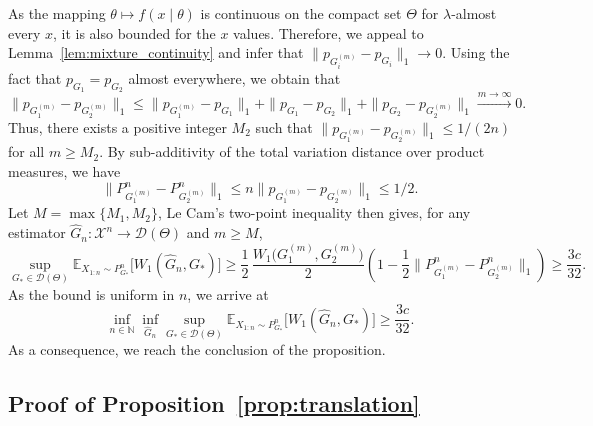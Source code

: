 \documentclass[11pt,twoside]{article} %
\begin{document}
As the mapping $\theta\mapsto f(x\mid \theta)$ is continuous on the compact set $\Theta$ for $\lambda$-almost every $x$, it is also bounded for the $x$ values. Therefore, we appeal to Lemma~\ref{lem:mixture_continuity} and infer that $\|p_{G_i^{(m)}}-p_{G_i}\|_1\to0$. Using the fact that $p_{G_1}=p_{G_2}$ almost everywhere, we obtain that
\begin{equation*}
    \|p_{G_1^{(m)}}-p_{G_2^{(m)}}\|_1
    \le\|p_{G_1^{(m)}}-p_{G_1}\|_1+ \|p_{G_1} - p_{G_2}\|_1 + \|p_{G_2}-p_{G_2^{(m)}}\|_1\xrightarrow{m\to\infty}0 .
\end{equation*}
Thus, there exists a positive integer $M_2$ such that $\|p_{G_1^{(m)}}-p_{G_2^{(m)}}\|_1\le 1/(2n)$ for all $m \geq M_2$. By sub-additivity of the total variation distance over product
measures, we have
$$\|P^n_{G_1^{(m)}}-P^n_{G_2^{(m)}}\|_1\le n\|p_{G_1^{(m)}}-p_{G_2^{(m)}}\|_1\le 1/2.$$
Let $M = \max\{M_1,M_2\}$, Le Cam's
two-point inequality \citep[e.g.,][Lemma 15.9]{wainwright2019high} then gives, for any estimator $\hat G_n:\mathcal X^n\to\mathcal D(\Theta)$ and $m \geq M$, 
\begin{equation*}
    \sup_{G_*\in\mathcal D(\Theta)}\mathbb E_{X_{1:n}\sim P_{G_*}^n}\big[W_1(\widehat G_n,G_*)\big]
    \geq    \frac{1}{2}\,\frac{W_1\big(G_1^{(m)},G_2^{(m)}\big)}{2}\left(1-\frac12\|P^n_{G_1^{(m)}}-P^n_{G_2^{(m)}}\|_1\right)
    \geq \frac{3c}{32}.
\end{equation*}
As the bound is uniform in $n$, we arrive at
$$\inf_{n\in\mathbb N}\inf_{\hat G_n} \sup_{G_*\in\mathcal D(\Theta)}\mathbb E_{X_{1:n}\sim P_{G_*}^n}\big[W_1(\widehat G_n,G_*)\big] \ge\frac{3c}{32}.$$
As a consequence, we reach the conclusion of the proposition. 

\subsection{Proof of Proposition~\ref{prop:translation}}
\label{app:proof:prop_translation}
\end{document}
